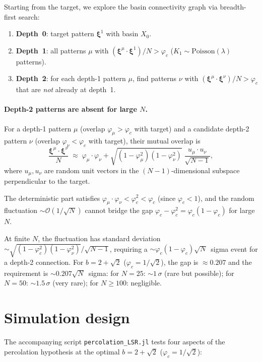 \documentclass[11pt]{article}
\newcommand{\vp}{\varphi}
\newcommand{\bxi}{\boldsymbol{\xi}}
\begin{document}
Starting from the target, we explore the basin connectivity
graph via breadth-first search:
\begin{enumerate}
  \item \textbf{Depth~0}: target pattern $\bxi^1$ with basin $X_0$.
  \item \textbf{Depth~1}: all patterns $\mu$ with
    $(\bxi^\mu \cdot \bxi^1)/N > \vp_c$
    ($K_1 \sim \mathrm{Poisson}(\lambda)$ patterns).
  \item \textbf{Depth~2}: for each depth-1 pattern $\mu$,
    find patterns $\nu$ with $(\bxi^\mu \cdot \bxi^\nu)/N > \vp_c$
    that are \emph{not} already at depth~1.
\end{enumerate}

\paragraph{Depth-2 patterns are absent for large $N$.}
For a depth-1 pattern $\mu$ (overlap $\vp_\mu > \vp_c$ with target)
and a candidate depth-2 pattern $\nu$ (overlap $\vp_\nu < \vp_c$
with target), their mutual overlap is
\begin{equation}
  \frac{\bxi^\mu \cdot \bxi^\nu}{N}
  \;\approx\; \vp_\mu \cdot \vp_\nu
  + \sqrt{(1-\vp_\mu^2)(1-\vp_\nu^2)}\;\frac{u_\mu \cdot u_\nu}{\sqrt{N-1}},
\end{equation}
where $u_\mu, u_\nu$ are random unit vectors in the $(N{-}1)$-dimensional
subspace perpendicular to the target.

The deterministic part satisfies
$\vp_\mu \cdot \vp_\nu < \vp_c^2 < \vp_c$
(since $\vp_c < 1$),
and the random fluctuation $\sim \mathcal{O}(1/\sqrt{N})$ cannot bridge the
gap $\vp_c - \vp_c^2 = \vp_c(1 - \vp_c)$ for large $N$.

At finite $N$, the fluctuation has standard deviation
$\sim \sqrt{(1-\vp_c^2)(1-\vp_\nu^2)}/\sqrt{N-1}$,
requiring a $\sim \vp_c(1-\vp_c)\sqrt{N}$~sigma event
for a depth-2 connection.
For $b = 2 + \sqrt{2}$ ($\vp_c = 1/\sqrt{2}$), the gap is
$\approx 0.207$ and the requirement is $\sim 0.207\sqrt{N}$~sigma:
for $N = 25$: $\sim 1\,\sigma$ (rare but possible);
for $N = 50$: $\sim 1.5\,\sigma$ (very rare);
for $N \geq 100$: negligible.


\section{Simulation design}

The accompanying script \texttt{percolation\_LSR.jl}
tests four aspects of the percolation hypothesis
at the optimal $b = 2 + \sqrt{2}$ ($\vp_c = 1/\sqrt{2}$):
\end{document}
